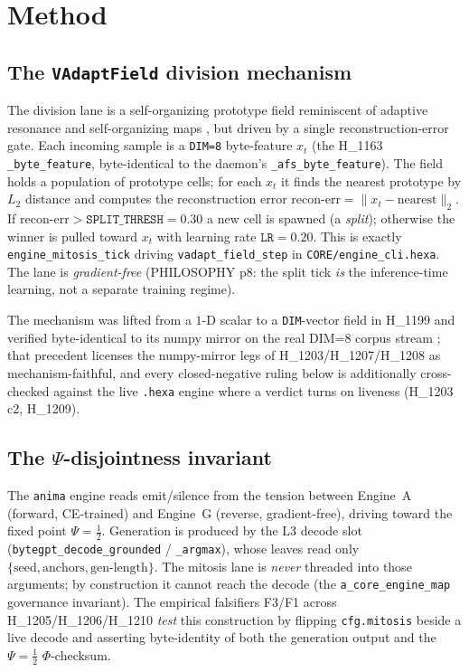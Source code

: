 \documentclass[11pt,a4paper]{article}
\newcommand{\Psihalf}{\Psi=\tfrac12}
\newcommand{\recon}{\mathrm{recon\text{-}err}}
\begin{document}
\section{Method}
\label{sec:method}

\subsection{The \texttt{VAdaptField} division mechanism}

The division lane is a self-organizing prototype field reminiscent of adaptive
resonance \citep{rumelhart1985art} and self-organizing maps
\citep{kohonen1982som}, but driven by a single reconstruction-error gate. Each
incoming sample is a \verb|DIM=8| byte-feature $x_t$ (the H\_1163
\verb|_byte_feature|, byte-identical to the daemon's \verb|_afs_byte_feature|).
The field holds a population of prototype cells; for each $x_t$ it finds the
nearest prototype by $L_2$ distance and computes the reconstruction error
$\recon = \lVert x_t - \text{nearest}\rVert_2$. If $\recon > \texttt{SPLIT\_THRESH}=0.30$
a new cell is spawned (a \emph{split}); otherwise the winner is pulled toward
$x_t$ with learning rate $\texttt{LR}=0.20$. This is exactly
\verb|engine_mitosis_tick| driving \verb|vadapt_field_step| in
\verb|CORE/engine_cli.hexa|. The lane is \emph{gradient-free} (PHILOSOPHY p8: the
split tick \emph{is} the inference-time learning, not a separate training
regime).

The mechanism was lifted from a $1$-D scalar to a \verb|DIM|-vector field in
H\_1199 and verified byte-identical to its numpy mirror on the real DIM=8
corpus stream \citep{anima_H1199}; that precedent licenses the numpy-mirror legs
of H\_1203/H\_1207/H\_1208 as mechanism-faithful, and every closed-negative
ruling below is additionally cross-checked against the live \texttt{.hexa}
engine where a verdict turns on liveness (H\_1203 c2, H\_1209).

\subsection{The $\Psi$-disjointness invariant}

The \texttt{anima} engine reads emit/silence from the tension between Engine~A
(forward, CE-trained) and Engine~G (reverse, gradient-free), driving toward the
fixed point $\Psihalf$. Generation is produced by the L3 decode slot
(\verb|bytegpt_decode_grounded| / \verb|_argmax|), whose leaves read only
$\{\text{seed},\text{anchors},\text{gen-length}\}$. The mitosis lane is
\emph{never} threaded into those arguments; by construction it cannot reach the
decode (the \verb|a_core_engine_map| governance invariant). The empirical
falsifiers F3/F1 across H\_1205/H\_1206/H\_1210 \emph{test} this construction by
flipping \verb|cfg.mitosis| beside a live decode and asserting byte-identity of
both the generation output and the $\Psihalf$ $\Phi$-checksum.
\end{document}
